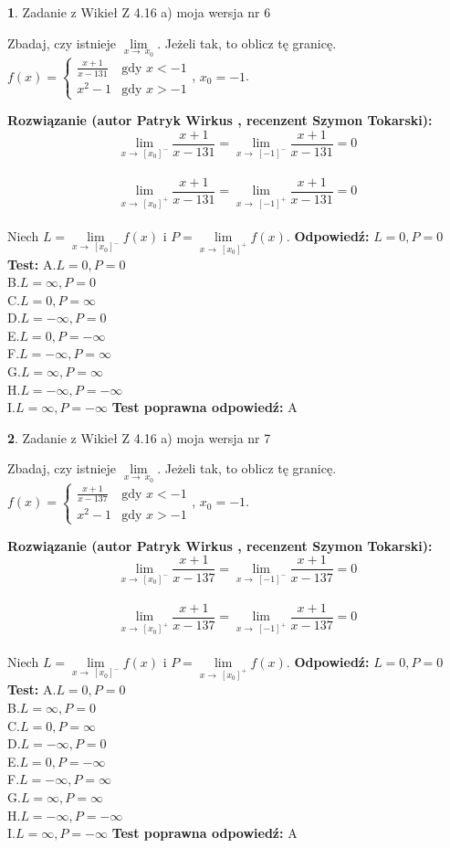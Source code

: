 \documentclass[12pt, a4paper]{article}
\theoremstyle{definition} %
\newtheorem{zad}{}
\newcommand{\zadStart}[1]{\begin{zad}#1\newline}
\newcommand{\zadStop}{\end{zad}}
\newcommand{\rozwStart}[2]{\noindent \textbf{Rozwiązanie (autor #1 , recenzent #2): }\newline}
\newcommand{\rozwStop}{\newline}
\newcommand{\odpStart}{\noindent \textbf{Odpowiedź:}\newline}
\newcommand{\odpStop}{\newline}
\newcommand{\testStart}{\noindent \textbf{Test:}\newline}
\newcommand{\testStop}{\newline}
\newcommand{\kluczStart}{\noindent \textbf{Test poprawna odpowiedź:}\newline}
\newcommand{\kluczStop}{\newline}
\begin{document}
\zadStart{Zadanie z Wikieł Z 4.16 a) moja wersja nr 6}

Zbadaj, czy istnieje $\lim\limits_{x\to\ x_{0}}$. Jeżeli tak, to oblicz tę granicę.\\   $f(x) = \left\{ \begin{array}{ll}
\frac{x+1}{x-131} & \textrm{gdy $x<-1$}\\
x^{2}-1 & \textrm{gdy $x>-1$}
\end{array} \right.$, $x_{0}=-1$.
\zadStop
\rozwStart{Patryk Wirkus}{Szymon Tokarski}
$$\lim\limits_{x\to\ [x_{0}]^{-}}\frac{x+1}{x-131} = \lim\limits_{x\to\ [-1]^{-}}\frac{x+1}{x-131} = 0$$
\\
$$\lim\limits_{x\to\ [x_{0}]^{+}}\frac{x+1}{x-131} = \lim\limits_{x\to\ [-1]^{+}}\frac{x+1}{x-131} = 0$$
\\
Niech $L=\lim\limits_{x\to\ [x_{0}]^{-}}f(x)$ i $P=\lim\limits_{x\to\ [x_{0}]^{+}}f(x)$.
\rozwStop
\odpStart
$L=0, P=0$
\odpStop
\testStart
A.$L=0, P=0$\\ B.$L=\infty, P=0$\\ C.$L=0, P=\infty$\\ D.$L=-\infty, P=0$\\ E.$L=0, P=-\infty$\\
F.$L=-\infty, P=\infty$\\ G.$L=\infty, P=\infty$\\
H.$L=-\infty, P=-\infty$\\
I.$L=\infty, P=-\infty$
\testStop
\kluczStart
A
\kluczStop



\zadStart{Zadanie z Wikieł Z 4.16 a) moja wersja nr 7}

Zbadaj, czy istnieje $\lim\limits_{x\to\ x_{0}}$. Jeżeli tak, to oblicz tę granicę.\\   $f(x) = \left\{ \begin{array}{ll}
\frac{x+1}{x-137} & \textrm{gdy $x<-1$}\\
x^{2}-1 & \textrm{gdy $x>-1$}
\end{array} \right.$, $x_{0}=-1$.
\zadStop
\rozwStart{Patryk Wirkus}{Szymon Tokarski}
$$\lim\limits_{x\to\ [x_{0}]^{-}}\frac{x+1}{x-137} = \lim\limits_{x\to\ [-1]^{-}}\frac{x+1}{x-137} = 0$$
\\
$$\lim\limits_{x\to\ [x_{0}]^{+}}\frac{x+1}{x-137} = \lim\limits_{x\to\ [-1]^{+}}\frac{x+1}{x-137} = 0$$
\\
Niech $L=\lim\limits_{x\to\ [x_{0}]^{-}}f(x)$ i $P=\lim\limits_{x\to\ [x_{0}]^{+}}f(x)$.
\rozwStop
\odpStart
$L=0, P=0$
\odpStop
\testStart
A.$L=0, P=0$\\ B.$L=\infty, P=0$\\ C.$L=0, P=\infty$\\ D.$L=-\infty, P=0$\\ E.$L=0, P=-\infty$\\
F.$L=-\infty, P=\infty$\\ G.$L=\infty, P=\infty$\\
H.$L=-\infty, P=-\infty$\\
I.$L=\infty, P=-\infty$
\testStop
\kluczStart
A
\kluczStop
\end{document}
